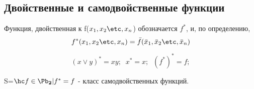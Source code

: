 \documentclass[unicode, 10pt, a4paper, oneside, fleqn]{article}
\begin{document}
\subsection{Двойственные и самодвойственные функции}
\begin{df}
  Функция, двойственная к f($\set[x]{n}$) обозначается $f^*$, и, по определению,
  \begin{displaymath}
    f^*(\set[x]{n}) = \bar f(\set[\bar x]{n})
  \end{displaymath}
\end{df}
\begin{ex}
  \begin{displaymath}
    (x\vee y)^*=xy;\;\; x^*=x;\;\; (f^*)^*=f;
  \end{displaymath}
\end{ex}
\begin{df}
  S=$\setof{f\in\PD}{f^*=f}$ - класс самодвойственных функций.
\end{df}
\end{document}

